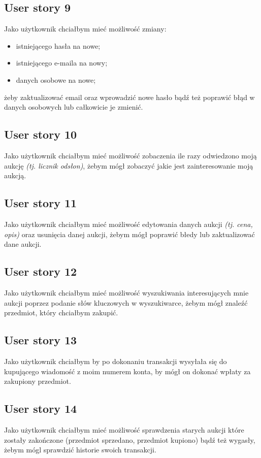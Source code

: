 \documentclass[a4paper]{article}
\begin{document}
	\subsection{User story 9}
	Jako użytkownik chciałbym mieć możliwość zmiany:
	\begin{itemize}
		\item istniejącego  hasła na nowe;
		\item istniejącego e-maila na nowy;
		\item danych osobowe na nowe;
	\end{itemize}
	żeby zaktualizować email oraz wprowadzić nowe hasło bądź też poprawić błąd w danych osobowych lub całkowicie je zmienić.
	
	\subsection{User story 10}
	Jako użytkownik chciałbym mieć możliwość zobaczenia ile razy odwiedzono moją aukcję \emph{ (tj. licznik odsłon)}, żebym mógł zobaczyć jakie jest zainteresowanie moją aukcją.
	
	\subsection{User story 11}
	Jako użytkownik chciałbym mieć możliwość edytowania danych aukcji \emph{ (tj. cena, opis)} oraz usunięcia danej aukcji, żebym mógł poprawić błedy lub zaktualizować dane aukcji.
	
	\subsection{User story 12}
	Jako użytkownik chciałbym mieć możliwość wyszukiwania interesujących mnie aukcji poprzez podanie słów kluczowych w wyszukiwarce, żebym mógł znaleźć przedmiot, który chciałbym zakupić.
	
	\subsection{User story 13}
	Jako użytkownik chciałbym by po dokonaniu transakcji wysyłała się do kupującego wiadomość z moim numerem konta, by mógł on dokonać wpłaty za zakupiony przedmiot.
	
	\subsection{User story 14}
	Jako użytkownik chciałbym mieć możliwość sprawdzenia starych aukcji które zostały zakończone (przedmiot sprzedano, przedmiot kupiono) bądź też wygasły, żebym mógl sprawdzić historie swoich transakcji.
	 
\end{document}
